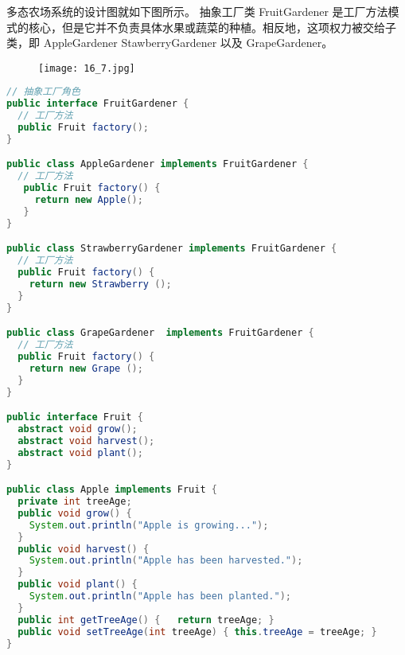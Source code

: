 \documentclass[../main.tex]{subfiles}
\begin{document}
\noindent 多态农场系统的设计图就如下图所示。
抽象工厂类 FruitGardener 是工厂方法模式的核心，但是它并不负责具体水果或蔬菜的种植。相反地，这项权力被交给子类，即 AppleGardener StawberryGardener 以及 GrapeGardener。
\begin{figure}[H]
  \texttt{[image: 16\_7.jpg]}
\end{figure}
%
\begin{lstlisting}[language=java]
// 抽象工厂角色
public interface FruitGardener {
  // 工厂方法
  public Fruit factory();
}

public class AppleGardener implements FruitGardener {
  // 工厂方法
   public Fruit factory() {
     return new Apple();
   }
}

public class StrawberryGardener implements FruitGardener {
  // 工厂方法
  public Fruit factory() {
    return new Strawberry ();
  }
}

public class GrapeGardener  implements FruitGardener {
  // 工厂方法
  public Fruit factory() {
    return new Grape ();
  }
}

public interface Fruit {
  abstract void grow();
  abstract void harvest();
  abstract void plant();
}

public class Apple implements Fruit {
  private int treeAge;
  public void grow() {
    System.out.println("Apple is growing...");
  }
  public void harvest() {
    System.out.println("Apple has been harvested.");
  }
  public void plant() {
    System.out.println("Apple has been planted.");
  }
  public int getTreeAge() {   return treeAge; }
  public void setTreeAge(int treeAge) { this.treeAge = treeAge; }
}
\end{lstlisting}
\end{document}
